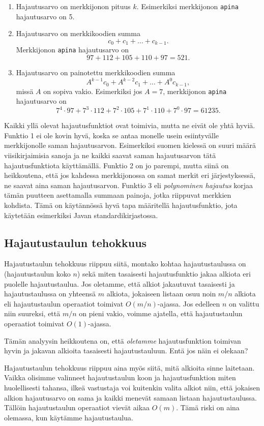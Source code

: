 \begin{enumerate}
\item Hajautusarvo on merkkijonon pituus $k$.
Esimerkiksi merkkijonon \texttt{apina} hajautusarvo on 5.
\item Hajautusarvo on merkkikoodien summa
\[ c_0 + c_1 + \dots + c_{k-1}.\]
Merkkijonon \texttt{apina} hajautusarvo on
\[97+112+105+110+97=521.\]
\item Hajautusarvo on painotettu merkkikoodien summa
\[ A^{k-1} c_0 + A^{k-2} c_1 + \dots + A^0 c_{k-1},\]
missä $A$ on sopiva vakio.
Esimerkiksi jos $A=7$, merkkijonon \texttt{apina} hajautusarvo on
\[7^4 \cdot 97+7^3 \cdot 112+7^2 \cdot 105+7^1 \cdot 110+7^0 \cdot 97=61235.\]
\end{enumerate}

Kaikki yllä olevat hajautusfunktiot ovat toimivia,
mutta ne eivät ole yhtä hyviä.
Funktio 1 ei ole kovin hyvä, koska se antaa monelle
usein esiintyvälle merkkijonolle saman hajautusarvon.
Esimerkiksi suomen kielessä on suuri määrä viisikirjaimisia
sanoja ja ne kaikki saavat saman hajautusarvon tätä
hajautusfunktiota käyttämällä.
Funktio 2 on jo parempi, mutta siinä on heikkoutena,
että jos kahdessa merkkijonossa on samat merkit eri
järjestyksessä, ne saavat aina saman hajautusarvon.
Funktio 3 eli \emph{polynominen hajautus} korjaa tämän puutteen
asettamalla summaan painoja, jotka riippuvat merkkien kohdista.
Tämä on käytännössä hyvä tapa määritellä hajautusfunktio,
jota käytetään esimerkiksi Javan standardikirjastossa.

\subsection{Hajautustaulun tehokkuus}

Hajautustaulun tehokkuus riippuu siitä, montako kohtaa
hajautustaulussa on (hajautustaulun koko $n$)
sekä miten tasaisesti hajautusfunktio jakaa alkiota
eri puolelle hajautustaulua.
Jos oletamme, että alkiot jakautuvat tasaisesti
ja hajautustaulussa on yhteensä $m$ alkiota,
jokaiseen listaan osuu noin $m/n$ alkiota
eli hajautustaulun operaatiot toimivat $O(m/n)$-ajassa.
Jos edelleen $n$ on valittu niin suureksi,
että $m/n$ on pieni vakio, voimme ajatella,
että hajautustaulun operaatiot toimivat $O(1)$-ajassa.

Tämän analyysin heikkoutena on, että \emph{oletamme}
hajautusfunktion toimivan hyvin ja jakavan alkioita
tasaisesti hajautustauluun. Entä jos näin ei olekaan?

Hajautustaulun tehokkuus riippuu aina myös siitä,
mitä alkioita sinne laitetaan.
Vaikka olisimme valinneet hajautustaulun koon ja
hajautusfunktion miten huolellisesti tahansa,
ilkeä vastustaja voi kuitenkin valita alkiot
niin, että jokaisen alkion hajautusarvo on sama ja
kaikki menevät samaan listaan hajautustaulussa.
Tällöin hajautustaulun operaatiot vievät aikaa $O(m)$.
Tämä riski on aina olemassa, kun käytämme hajautustaulua.

